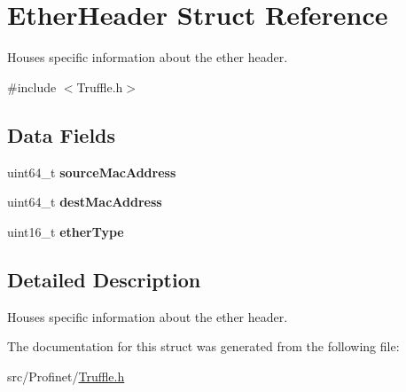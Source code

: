 \hypertarget{struct_ether_header}{}\section{Ether\+Header Struct Reference}
\label{struct_ether_header}


Houses specific information about the ether header.  




{\ttfamily \#include $<$Truffle.\+h$>$}

\subsection*{Data Fields}
\begin{DoxyCompactItemize}
\item 
\hypertarget{struct_ether_header_ab4999641b26b615e3eea9394a116ed62}{}uint64\+\_\+t {\bfseries source\+Mac\+Address}\label{struct_ether_header_ab4999641b26b615e3eea9394a116ed62}

\item 
\hypertarget{struct_ether_header_ac71ed57be2c8e9841e36a41875893e78}{}uint64\+\_\+t {\bfseries dest\+Mac\+Address}\label{struct_ether_header_ac71ed57be2c8e9841e36a41875893e78}

\item 
\hypertarget{struct_ether_header_a6a0916fd23f851ba6cd2bcd3700123b2}{}uint16\+\_\+t {\bfseries ether\+Type}\label{struct_ether_header_a6a0916fd23f851ba6cd2bcd3700123b2}

\end{DoxyCompactItemize}


\subsection{Detailed Description}
Houses specific information about the ether header. 

The documentation for this struct was generated from the following file\+:\begin{DoxyCompactItemize}
\item 
src/\+Profinet/\hyperlink{_truffle_8h}{Truffle.\+h}\end{DoxyCompactItemize}
